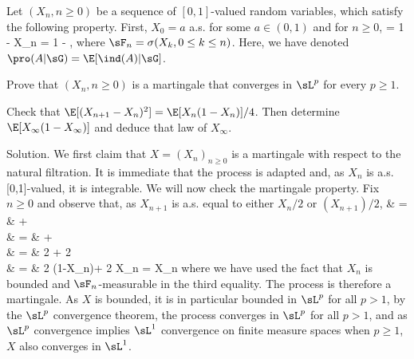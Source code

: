 \vspace{2mm}

\qcutline


\item Let $(X_n, n \geq  0)$ be a sequence of $[0, 1]$-valued random variables, which satisfy the following property. First, $X_0 = a$ a.s. for some $a \in (0, 1)$ and for $n \geq  0$,
\be
\pro{} = 1 - X_n = 1 - \pro{},
\ee
where $\sF_n = \sigma(X_k, 0 \leq k \leq n)$. Here, we have denoted $\pro(A|\sG) = \E[\ind(A)|\sG]$.
\ben
\item [(i)] Prove that $(X_n, n \geq  0)$ is a martingale that converges in $\sL^p$ for every $p \geq  1$.
\item [(ii)] Check that $\E[(X_{n+1} - X_n)^2] = \E[X_n(1 - X_n)]/4$. Then determine $\E[X_\infty(1 - X_\infty)]$ and deduce that law of $X_\infty$.
\een

\scutline

Solution. We first claim that $X = (X_n)_{n\geq 0}$ is a martingale with respect to the natural filtration. It is immediate that the process is adapted and, as $X_n$ is a.s. [0,1]-valued, it is integrable. We will now check the martingale property. Fix $n \geq 0$ and observe that, as $X_{n+1}$ is a.s. equal to either $X_n/2$ or $(X_{n+1})/2$,
\beast
\E[X_{n+1}|\sF_n] & = & \E[X_{n+1}\ind_{\bra{X_{n+1} =X_n/2}}|\sF_n]+\E[X_{n+1} \ind_{\bra{X_{n+1}=(X_n+1)/2}}|\sF_n]\\
& = & \E{} + \E{} \\
& = & 2 \cdot \E[\ind_{\bra{X_{n+1}=X_n/2}}|\sF_n]+  2 \cdot \E[\ind_{\bra{X_{n+1}=(X_n+1)/2}}|\sF_n]\\
& = & 2 \cdot (1-X_n)+ 2 \cdot X_n = X_n
\eeast
where we have used the fact that $X_n$ is bounded and $\sF_n$-measurable in the third equality. The process is therefore a martingale. As $X$ is bounded, it is in particular bounded in $\sL^p$ for all $p > 1$, by the $\sL^p$ convergence theorem, the process converges in $\sL^p$ for all $p > 1$, and as $\sL^p$
convergence implies $\sL^1$ convergence on finite measure spaces when $p \geq 1$, $X$ also converges in $\sL^1$.


